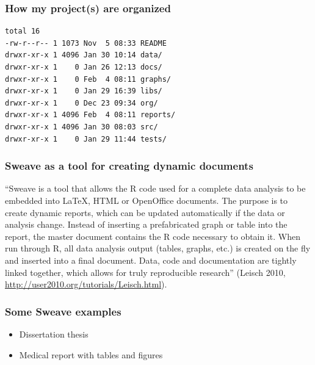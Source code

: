 \documentclass[bigger]{beamer}
\begin{document}
\begin{frame}[fragile]
\frametitle{How my project(s) are organized}
\label{sec-2_4}




\begin{lstlisting}
total 16
-rw-r--r-- 1 1073 Nov  5 08:33 README
drwxr-xr-x 1 4096 Jan 30 10:14 data/
drwxr-xr-x 1    0 Jan 26 12:13 docs/
drwxr-xr-x 1    0 Feb  4 08:11 graphs/
drwxr-xr-x 1    0 Jan 29 16:39 libs/
drwxr-xr-x 1    0 Dec 23 09:34 org/
drwxr-xr-x 1 4096 Feb  4 08:11 reports/
drwxr-xr-x 1 4096 Jan 30 08:03 src/
drwxr-xr-x 1    0 Jan 29 11:44 tests/
\end{lstlisting}
\end{frame}
\begin{frame}
\frametitle{Sweave as a tool for creating dynamic documents}
\label{sec-2_5}


``Sweave is a tool that allows the R code used for a complete data analysis to be embedded into
\LaTeX{}, HTML or OpenOffice documents. The purpose is to create dynamic reports, which can be updated
automatically if the data or analysis change. Instead of inserting a prefabricated graph or table
into the report, the master document contains the R code necessary to obtain it. When run through R,
all data analysis output (tables, graphs, etc.) is created on the fly and inserted into a final
document. Data, code and documentation are tightly linked together, which allows for truly
reproducible research'' (Leisch 2010, \href{http://user2010.org/tutorials/Leisch.html}{http://user2010.org/tutorials/Leisch.html}). 

  
\end{frame}
\begin{frame}
\frametitle{Some Sweave examples}
\label{sec-2_6}
\begin{itemize}

\item Dissertation thesis\\
\label{sec-2_6_1}%
\item Medical report with tables and figures\\
\label{sec-2_6_2}%
\end{itemize} %
\end{frame}
\end{document}
